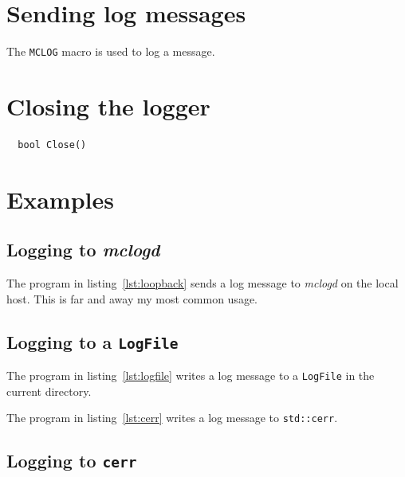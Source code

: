 \section{Sending log messages}
The \texttt{MCLOG} macro is used to log a message.

\section{Closing the logger}
\begin{verbatim}
  bool Close()
\end{verbatim}

\section{Examples}

\begin{minipage}{\linewidth}
\subsection{Logging to \textit{mclogd}}
The program in listing~\ref{lst:loopback} sends a log message to
\textit{mclogd} on the local host.  This is far and away my most
common usage.


\end{minipage}

\begin{minipage}{\linewidth}
\subsection{Logging to a \texttt{LogFile}}
The program in listing~\ref{lst:logfile} writes a log message to a \texttt{LogFile} in the current directory.


\end{minipage}

\begin{minipage}{\linewidth}
The program in listing~\ref{lst:cerr} writes a log message to \texttt{std::cerr}.
\subsection{Logging to \texttt{cerr}}

\end{minipage}
